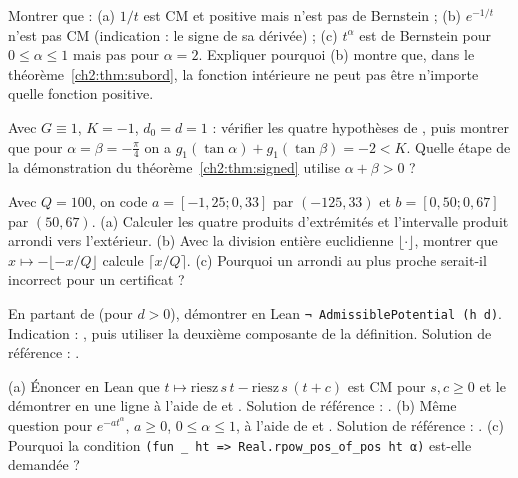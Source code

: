 \begin{exercise}[CM ou Bernstein ?]
Montrer que : (a) $1/t$ est CM et positive mais n'est pas de Bernstein ; (b) $e^{-1/t}$ n'est pas CM (indication :
le signe de sa dérivée) ; (c) $t^\alpha$ est de Bernstein pour $0\le\alpha\le1$ mais pas pour $\alpha=2$. Expliquer
pourquoi (b) montre que, dans le théorème~\ref{ch2:thm:subord}, la fonction intérieure ne peut pas être n'importe
quelle fonction positive.
\end{exercise}

\begin{exercise}\label{ch2:ex:signed}
Avec $G\equiv1$, $K=-1$, $d_0=d=1$ : vérifier les quatre hypothèses de , puis montrer que pour
$\alpha=\beta=-\frac\pi4$ on a $g_1(\tan\alpha)+g_1(\tan\beta)=-2<K$. Quelle étape de la démonstration du
théorème~\ref{ch2:thm:signed} utilise $\alpha+\beta>0$ ?
\end{exercise}

\begin{exercise}
Avec $Q=100$, on code $a=[-1{,}25;0{,}33]$ par $(-125,33)$ et $b=[0{,}50;0{,}67]$ par $(50,67)$. (a) Calculer les quatre
produits d'extrémités et l'intervalle produit arrondi vers l'extérieur. (b) Avec la division entière euclidienne
$\lfloor\cdot\rfloor$, montrer que $x\mapsto-\lfloor -x/Q\rfloor$ calcule $\lceil x/Q\rceil$. (c) Pourquoi un arrondi
au plus proche serait-il incorrect pour un certificat ?
\end{exercise}

\begin{exercise}
En partant de  (pour $d>0$), démontrer en Lean \lstinline[style=chdeux]!¬ AdmissiblePotential (h d)!.
Indication : , puis utiliser la deuxième composante  de la définition. Solution de référence :
 \tierA.
\end{exercise}

\begin{exercise}
(a) Énoncer en Lean que $t\mapsto\mathrm{riesz}\,s\,t-\mathrm{riesz}\,s\,(t+c)$ est CM pour $s,c\ge0$ et le démontrer en
une ligne à l'aide de  et . Solution de référence :
 \tierA. (b) Même question pour $e^{-at^\alpha}$, $a\ge0$, $0\le\alpha\le1$, à l'aide de
 et . Solution de référence :  \tierA.
(c) Pourquoi la condition \lstinline[style=chdeux]!(fun _ ht => Real.rpow_pos_of_pos ht α)! est-elle demandée ?
\end{exercise}

\label{ch2:fin}
